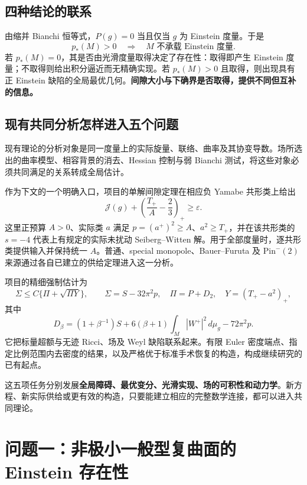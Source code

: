 \documentclass[11pt,a4paper]{article}
\newcommand{\dd}{\,d\mu_g}
\theoremstyle{definition}
\numberwithin{equation}{section}
\begin{document}
\subsection{四种结论的联系}
由缩并 Bianchi 恒等式，$P(g)=0$ 当且仅当 $g$ 为 Einstein 度量。于是
\[
p_*(M)>0\quad\Longrightarrow\quad M\text{ 不承载 Einstein 度量}.
\]
若 $p_*(M)=0$，其是否由光滑度量取得决定了存在性：取得即产生 Einstein 度量；不取得则给出积分逼近而无精确实现。若 $p_*(M)>0$ 且取得，则出现具有正 Einstein 缺陷的全局最优几何。\textbf{间隙大小与下确界是否取得，提供不同但互补的信息。}

\subsection{现有共同分析怎样进入五个问题}
现有理论的分析对象是同一度量上的实际旋量、联络、曲率及其协变导数。场所选出的曲率模型、相容背景的消去、Hessian 控制与弱 Bianchi 测试，将这些对象必须共同满足的关系转成全局估计。

作为下文的一个明确入口，项目的单解间隙定理在相应负 Yamabe 共形类上给出
\begin{equation}
\boxed{\mathcal J(g)+\left(\frac{T_+}{A}-\frac23\right)_+\ge\varepsilon.}\label{eq:N1}
\end{equation}
这里正预算 $A>0$、实际类 $a$ 满足 $p=(a^+)^2\ge A$、$a^2\ge T_+$，并在该共形类的 $s=-4$ 代表上有规定的实际未扰动 Seiberg--Witten 解。用于全部度量时，逐共形类提供输入并保持统一 $A$。普通、special monopole、Bauer--Furuta 及 $\mathrm{Pin}^-(2)$ 来源通过各自已建立的供给定理进入这一分析。

项目的精细强制估计为
\begin{equation}
\Sigma\le C\{\Pi+\sqrt{\Pi Y}\},\qquad
\Sigma=S-32\pi^2p,\quad\Pi=P+D_2,\quad Y=(T_+-a^2)_+,\label{eq:coercive}
\end{equation}
其中
\[
D_\beta=(1+\beta^{-1})S+6(\beta+1)\int_M|W^+|^2\dd-72\pi^2p.
\]
它把标量超额与无迹 Ricci、场及 Weyl 缺陷联系起来。有限 Euler 密度端点、指定比例范围内去密度的结果，以及严格优于标准手术恢复的构造，构成继续研究的已有起点\cite{Project}。

这五项任务分别发展\textbf{全局障碍、最优变分、光滑实现、场的可积性和动力学}。新方程、新实际供给或更有效的构造，只要能建立相应的完整数学连接，都可以进入共同理论。

\section{问题一：非极小一般型复曲面的 Einstein 存在性}
\label{sec:minimality}
\end{document}
